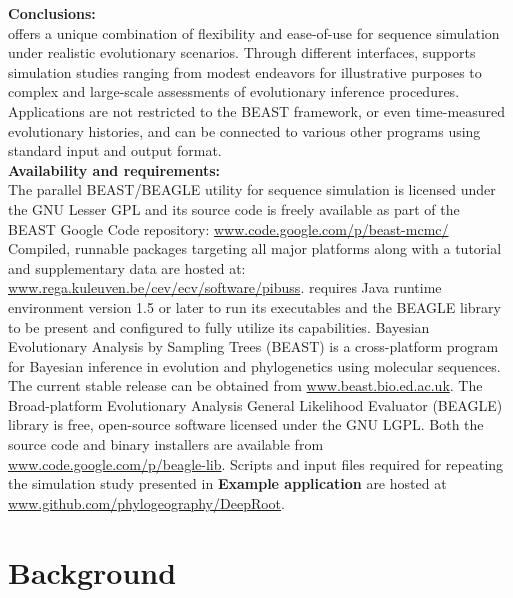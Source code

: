 \noindent
\textbf{Conclusions:} \\
{\bussname} offers a unique combination of flexibility and ease-of-use for sequence simulation under realistic evolutionary scenarios. 
Through different interfaces, {\bussname} supports simulation studies ranging from modest endeavors for illustrative purposes  to complex and large-scale assessments of evolutionary inference procedures.
Applications are not restricted to the BEAST framework, or even time-measured evolutionary histories, and {\bussname} can be connected to various other programs using standard input and output format. \\


\noindent
\textbf{Availability and requirements:} \\
The parallel BEAST/BEAGLE utility for sequence simulation is licensed under the GNU Lesser GPL and its source code is freely available as part of the BEAST Google Code repository: \url{www.code.google.com/p/beast-mcmc/}
Compiled, runnable packages targeting all major platforms along with a tutorial and supplementary data are hosted at:
\url{www.rega.kuleuven.be/cev/ecv/software/pibuss}.
{\bussname} requires Java runtime environment version 1.5 or later to run its executables and the BEAGLE library to be present and configured to fully utilize its capabilities.
Bayesian Evolutionary Analysis by Sampling Trees (BEAST) is a cross-platform program for Bayesian inference in evolution and phylogenetics using molecular sequences. 
The current stable release can be obtained from \url{www.beast.bio.ed.ac.uk}.
The Broad-platform Evolutionary Analysis General Likelihood Evaluator (BEAGLE) library is free, open-source software licensed under the GNU LGPL. Both the source code and binary installers are available from \url{www.code.google.com/p/beagle-lib}. 
Scripts and input files required for repeating the simulation study presented in {\bf{Example application}} are hosted at \url{www.github.com/phylogeography/DeepRoot}.


\section{Background}

